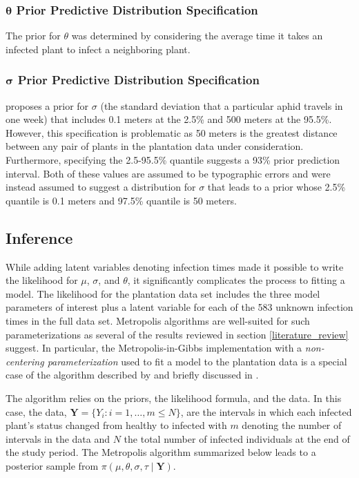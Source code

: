 \documentclass{uwstat572}
\begin{document}
\subsubsection{$\boldsymbol{\theta}$ Prior Predictive Distribution Specification}
The prior for $\theta$ was determined by considering the average time it takes an infected plant to infect a neighboring plant. 


\subsubsection{$\boldsymbol{\sigma}$ Prior Predictive Distribution Specification}
\citet{Brown} proposes a prior for $\sigma$ (the standard deviation that a particular aphid travels in one week) that includes 0.1 meters at the 2.5\% and 500 meters at the 95.5\%. 
However, this specification is problematic as 50 meters is the greatest distance between any pair of plants in the plantation data under consideration. 
Furthermore, specifying the 2.5-95.5\% quantile suggests a 93\% prior prediction interval. 
Both of these values are assumed to be typographic errors and were instead assumed to suggest a distribution for $\sigma$ that leads to a prior whose 2.5\% quantile is 0.1 meters and 97.5\% quantile is 50 meters. 

\subsection{Inference}
While adding latent variables denoting infection times made it possible to write the likelihood for $\mu$, $\sigma$, and $\theta$, it significantly complicates the process to fitting a model. 
The likelihood for the plantation data set includes the three model parameters of interest plus a latent variable for each of the 583 unknown infection times in the full data set. 
Metropolis algorithms are well-suited for such parameterizations as several of the results reviewed in section \ref{literature_review} suggest.  
In particular, the Metropolis-in-Gibbs implementation with a \textit{non-centering parameterization} used to fit a model to the plantation data is a special case of the algorithm described by \citet{Jewell} and briefly discussed in \citet{ONeill}.  

The algorithm relies on the priors, the likelihood formula, and the data. 
In this case, the data, $\textbf{Y} = \{Y_i:i=1,\dots, m \le N\}$, are the intervals in which each infected plant's status changed from healthy to infected with $m$ denoting the number of intervals in the data and $N$ the total number of infected individuals at the end of the study period. 
The Metropolis algorithm summarized below leads to a posterior sample from $\pi(\mu, \theta, \sigma, \tau \mid \textbf{Y})$. 
\end{document}
